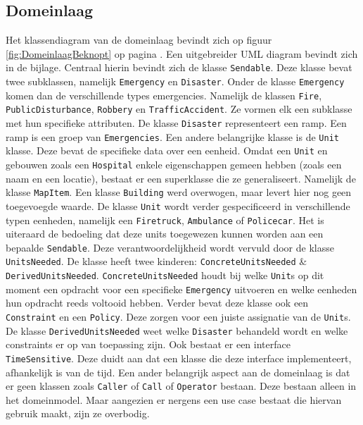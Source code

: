 \subsection{Domeinlaag}
 Het klassendiagram van de domeinlaag bevindt zich op figuur \ref{fig:DomeinlaagBeknopt} op pagina \pageref{fig:DomeinlaagBeknopt}. Een uitgebreider UML diagram bevindt zich in de bijlage. Centraal hierin bevindt zich de klasse \texttt{Sendable}. Deze klasse bevat twee subklassen, namelijk \texttt{Emergency} en \texttt{Disaster}. Onder de klasse \texttt{Emergency} komen dan de verschillende types emergencies. Namelijk de klassen \texttt{Fire}, \texttt{PublicDisturbance}, \texttt{Robbery} en \texttt{TrafficAccident}. Ze vormen elk een subklasse met hun specifieke attributen. De klasse \texttt{Disaster} representeert een ramp. Een ramp is een groep van \texttt{Emergencies}. Een andere belangrijke klasse is de \texttt{Unit} klasse. Deze bevat de specifieke data over een eenheid. Omdat een \texttt{Unit} en gebouwen zoals een \texttt{Hospital} enkele eigenschappen gemeen hebben (zoals een naam en een locatie), bestaat er een superklasse die ze generaliseert. Namelijk de klasse \texttt{MapItem}. Een klasse \texttt{Building} werd overwogen, maar levert hier nog geen toegevoegde waarde. De klasse \texttt{Unit} wordt verder gespecificeerd in verschillende typen eenheden, namelijk een \texttt{Firetruck}, \texttt{Ambulance} of \texttt{Policecar}. Het is uiteraard de bedoeling dat deze units toegewezen kunnen worden aan een bepaalde \texttt{Sendable}. Deze verantwoordelijkheid wordt vervuld door de klasse \texttt{UnitsNeeded}. De klasse heeft twee kinderen: \texttt{ConcreteUnitsNeeded} \& \texttt{DerivedUnitsNeeded}. \texttt{ConcreteUnitsNeeded} houdt bij welke \texttt{Unit}s op dit moment een opdracht voor een specifieke \texttt{Emergency} uitvoeren en welke eenheden hun opdracht reeds voltooid hebben. Verder bevat deze klasse ook een \texttt{Constraint} en een \texttt{Policy}. Deze zorgen voor een juiste assignatie van de \texttt{Unit}s. De klasse \texttt{DerivedUnitsNeeded} weet welke \texttt{Disaster} behandeld wordt en welke constraints er op van toepassing zijn. Ook bestaat er een interface \texttt{TimeSensitive}. Deze duidt aan dat een klasse die deze interface implementeert, afhankelijk is van de tijd. Een ander belangrijk aspect aan de domeinlaag is dat er geen klassen zoals \texttt{Caller} of \texttt{Call} of \texttt{Operator} bestaan. Deze bestaan alleen in het domeinmodel. Maar aangezien er nergens een use case bestaat die hiervan gebruik maakt, zijn ze overbodig.
 
